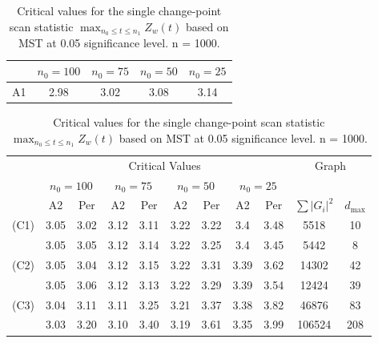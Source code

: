 \documentclass[arxiv, preprint]{imsart}
\numberwithin{equation}{section}
\theoremstyle{plain}
\begin{document}
\begin{table}[h]
\centering 
 \caption{Critical values for the single change-point scan statistic $\max_{n_0 \le t \le n_1} Z_w(t)$ based on MST at 0.05 significance level. n = 1000.}
  \label{table:Rw_CV05_reduced}
\begin{tabular}{|c|c|c|c|c|}
\hline  
\hline
& $n_0 = 100$ & $n_0 = 75$ & $n_0 = 50$ & $n_0 = 25$\\
\hline
A1  & 2.98 & 3.02 &  3.08 & 3.14 \\
\hline 
\end{tabular} 

\vspace{2mm}

\begin{tabular}{c|cc|cc|cc|cc|cc} 
\hline  
\hline
& \multicolumn{8}{c}{Critical Values} & \multicolumn{2}{|c}{Graph} \\
\cline{2-11}
& \multicolumn{2}{|c|}{$n_0 = 100$} &  \multicolumn{2}{|c|}{$n_0 = 75$} &  \multicolumn{2}{|c|}{$n_0 = 50$} &  \multicolumn{2}{|c|}{$n_0 = 25$} \\
\cline{2-9}
& A2 & Per &  A2 &Per & A2 &Per &  A2 &Per &  $\sum|G_i|^2$ & $d_{\max}$ \\
\hline 
\hline
\multirow{2}{0.7cm}{(C1)}
& 3.05 & 3.02 & 3.12 & 3.11 & 3.22 & 3.22 & 3.4 & 3.48 & 5518 & 10\\
& 3.05 & 3.05 & 3.12 & 3.14 & 3.22 & 3.25 & 3.4 & 3.45 & 5442 &  8\\
\hline
\multirow{2}{0.7cm}{(C2)}
& 3.05 & 3.04 & 3.12 & 3.15 & 3.22 & 3.31 & 3.39 & 3.62 & 14302 & 42 \\
& 3.05 & 3.06 & 3.12 & 3.13 & 3.22 & 3.29 & 3.39 & 3.54 & 12424 & 39 \\
\hline
\multirow{2}{0.7cm}{(C3)}
& 3.04 & 3.11 & 3.11 & 3.25 & 3.21 & 3.37 & 3.38 & 3.82 &  46876 &  83 \\
& 3.03 & 3.20 & 3.10 & 3.40 & 3.19 & 3.61 & 3.35 & 3.99 & 106524 & 208 \\
\hline
\hline 
\end{tabular} 
\end{table} 
\end{document}
